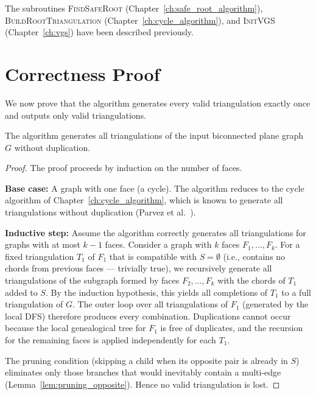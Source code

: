 The subroutines \textsc{FindSafeRoot} (Chapter~\ref{ch:safe_root_algorithm}), \textsc{BuildRootTriangulation} (Chapter~\ref{ch:cycle_algorithm}), and \textsc{InitVGS} (Chapter~\ref{ch:vgs}) have been described previously.

\section{Correctness Proof}
\label{sec:correctness_complete}

We now prove that the algorithm generates every valid triangulation exactly once and outputs only valid triangulations.

\begin{theorem}[Completeness]
    \label{thm:completeness_final}
    The algorithm generates all triangulations of the input biconnected plane graph \(G\) without duplication.
\end{theorem}

\begin{proof}
    The proof proceeds by induction on the number of faces.

    \textbf{Base case:} A graph with one face (a cycle). 
    The algorithm reduces to the cycle algorithm of Chapter~\ref{ch:cycle_algorithm}, which is known to generate all triangulations without duplication (Parvez et al.~\cite{parvez2011}).

    \textbf{Inductive step:} Assume the algorithm correctly generates all triangulations for graphs with at most \(k-1\) faces. 
    Consider a graph with \(k\) faces \(F_1, \dots, F_k\). 
    For a fixed triangulation \(T_1\) of \(F_1\) that is compatible with \(S = \emptyset\) (i.e., contains no chords from previous faces — trivially true), we recursively generate all triangulations of the subgraph formed by faces \(F_2, \dots, F_k\) with the chords of \(T_1\) added to \(S\). 
    By the induction hypothesis, this yields all completions of \(T_1\) to a full triangulation of \(G\). 
    The outer loop over all triangulations of \(F_1\) (generated by the local DFS) therefore produces every combination. 
    Duplications cannot occur because the local genealogical tree for \(F_1\) is free of duplicates, and the recursion for the remaining faces is applied independently for each \(T_1\).

    The pruning condition (skipping a child when its opposite pair is already in \(S\)) eliminates only those branches that would inevitably contain a multi-edge (Lemma~\ref{lem:pruning_opposite}). 
    Hence no valid triangulation is lost.
\end{proof}

